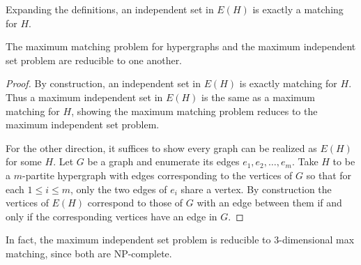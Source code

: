 Expanding the definitions, an independent set in $E(H)$ is exactly a matching for $H$.

\begin{proposition}
    The maximum matching problem for hypergraphs and the maximum independent set problem are reducible to one another. 
\end{proposition}

\begin{proof}
    By construction, an independent set in $E(H)$ is exactly matching for $H$. Thus a maximum independent set in $E(H)$ is the same as a maximum matching for $H$, showing the maximum matching problem reduces to the maximum independent set problem.
    
    For the other direction, it suffices to show every graph can be realized as $E(H)$ for some $H$. Let $G$ be a graph and enumerate its edges $e_{1}, e_{2}, \ldots, e_{m}$. Take $H$ to be a $m$-partite hypergraph with edges corresponding to the vertices of $G$ so that for each $1 \leq i \leq m$, only the two edges of $e_{i}$ share a vertex. By construction the vertices of $E(H)$ correspond to those of $G$ with an edge between them if and only if the corresponding vertices have an edge in $G$.
\end{proof}

\begin{remark}
    In fact, the maximum independent set problem is reducible to 3-dimensional max matching, since both are NP-complete. \cite{karp21}
\end{remark}
